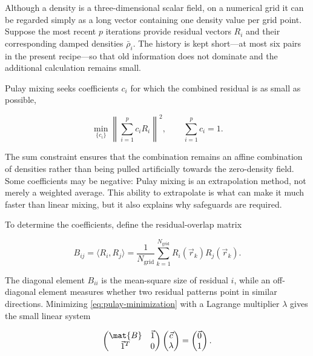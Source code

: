 Although a density is a three-dimensional scalar field, on a numerical grid it can be regarded simply as a long vector containing one density value per grid point. Suppose the most recent \(p\) iterations provide residual vectors \(R_i\) and their corresponding damped densities \(\bar{\rho}_i\). The history is kept short---at most six pairs in the present recipe---so that old information does not dominate and the additional calculation remains small.

Pulay mixing seeks coefficients \(c_i\) for which the combined residual is as small as possible,

\begin{equation}
    \min_{\{c_i\}}
    \left\|\sum_{i=1}^{p}c_iR_i\right\|^{2},
    \qquad
    \sum_{i=1}^{p}c_i=1.
    \label{eq:pulay-minimization}
\end{equation}

The sum constraint ensures that the combination remains an affine combination of densities rather than being pulled artificially towards the zero-density field. Some coefficients may be negative: Pulay mixing is an extrapolation method, not merely a weighted average. This ability to extrapolate is what can make it much faster than linear mixing, but it also explains why safeguards are required.

To determine the coefficients, define the residual-overlap matrix

\begin{equation}
    B_{ij}=\langle R_i,R_j\rangle
    =\frac{1}{N_{\text{grid}}}
    \sum_{k=1}^{N_{\text{grid}}}R_i(\vec{r}_k)R_j(\vec{r}_k).
    \label{eq:pulay-overlap}
\end{equation}

The diagonal element \(B_{ii}\) is the mean-square size of residual \(i\), while an off-diagonal element measures whether two residual patterns point in similar directions. Minimizing \cref{eq:pulay-minimization} with a Lagrange multiplier \(\lambda\) gives the small linear system

\begin{equation}
    \begin{pmatrix}
        \mat{B} & \vec{1} \\
        \vec{1}^{T} & 0
    \end{pmatrix}
    \begin{pmatrix}
        \vec{c} \\
        \lambda
    \end{pmatrix}
    =
    \begin{pmatrix}
        \vec{0} \\
        1
    \end{pmatrix}.
    \label{eq:pulay-system}
\end{equation}

